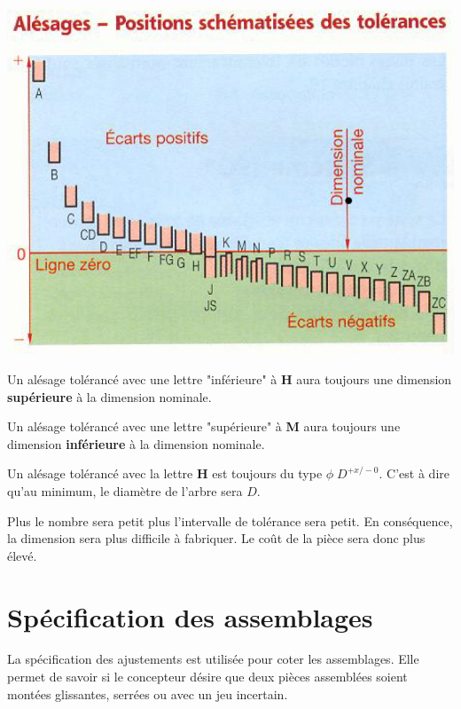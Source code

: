 \documentclass[11pt,oneside]{article}
\begin{document}
\begin{minipage}[c]{.45\linewidth}
\begin{center}
\includegraphics[width=.9\textwidth]{png/alesage}
\end{center}

Un alésage tolérancé avec une lettre "inférieure" à \textbf{H} aura toujours une dimension \textbf{supérieure} à la dimension nominale.

Un alésage tolérancé avec une lettre "supérieure" à \textbf{M} aura toujours une dimension \textbf{inférieure} à la dimension nominale.

Un alésage tolérancé avec la lettre \textbf{H} est toujours du type $\phi\; D ^{+x / -0}$. C'est à dire qu'au minimum, le diamètre de l'arbre sera $D$.
\end{minipage}

\begin{rem}
Plus le nombre sera petit plus l'intervalle de tolérance sera petit. En conséquence, la dimension sera plus difficile à fabriquer. Le coût de la pièce sera donc plus élevé. 
\end{rem}


\section{Spécification des assemblages}
La spécification des ajustements est utilisée pour coter les assemblages. Elle permet de savoir si le concepteur désire que deux pièces assemblées soient montées glissantes, serrées ou avec un jeu incertain.
\end{document}
